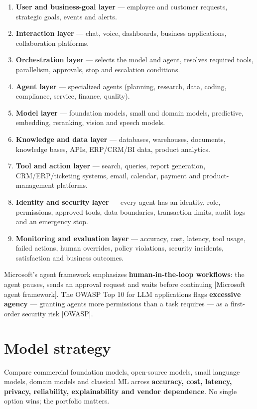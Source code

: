 \begin{enumerate}
  \item \textbf{User and business-goal layer} — employee and customer
        requests, strategic goals, events and alerts.
  \item \textbf{Interaction layer} — chat, voice, dashboards, business
        applications, collaboration platforms.
  \item \textbf{Orchestration layer} — selects the model and agent, resolves
        required tools, parallelism, approvals, stop and escalation
        conditions.
  \item \textbf{Agent layer} — specialized agents (planning, research, data,
        coding, compliance, service, finance, quality).
  \item \textbf{Model layer} — foundation models, small and domain models,
        predictive, embedding, reranking, vision and speech models.
  \item \textbf{Knowledge and data layer} — databases, warehouses, documents,
        knowledge bases, APIs, ERP/CRM/BI data, product analytics.
  \item \textbf{Tool and action layer} — search, queries, report generation,
        CRM/ERP/ticketing systems, email, calendar, payment and
        product-management platforms.
  \item \textbf{Identity and security layer} — every agent has an identity,
        role, permissions, approved tools, data boundaries, transaction
        limits, audit logs and an emergency stop.
  \item \textbf{Monitoring and evaluation layer} — accuracy, cost, latency,
        tool usage, failed actions, human overrides, policy violations,
        security incidents, satisfaction and business outcomes.
\end{enumerate}

Microsoft's agent framework emphasizes \textbf{human-in-the-loop workflows}:
the agent pauses, sends an approval request and waits before continuing
[Microsoft agent framework]. The OWASP Top 10 for LLM applications flags
\textbf{excessive agency} — granting agents more permissions than a task
requires — as a first-order security risk [OWASP].

\section{Model strategy}

Compare commercial foundation models, open-source models, small language
models, domain models and classical ML across \textbf{accuracy, cost, latency,
privacy, reliability, explainability and vendor dependence}. No single option
wins; the portfolio matters.


